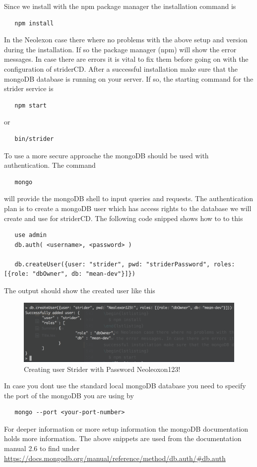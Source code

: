 Since we install with the npm package manager the installation command is
\begin{lstlisting}
   npm install
\end{lstlisting}
In the Neolexon case there where no problems with the above setup and version during the installation. If so the package manager (npm) will
show the error messages. In case there are errors it is vital to fix them before going on with the configuration of striderCD. After a
successful installation make sure that the mongoDB database is running on your server. If so, the starting command for the strider service is
\begin{lstlisting}
   npm start
\end{lstlisting}
or
\begin{lstlisting}
   bin/strider
\end{lstlisting}
To use a more secure approache the mongoDB should be used with authentication. The command
\begin{lstlisting}
   mongo
\end{lstlisting}
will provide the mongoDB shell to input queries and requests. The authentication plan is to create a mongoDB user which has access
rights to the database we will create and use for striderCD. The following code snipped shows how to to this
\begin{lstlisting}
   use admin
   db.auth( <username>, <password> )

   db.createUser({user: "strider", pwd: "striderPassword", roles: [{role: "dbOwner", db: "mean-dev"}]})
\end{lstlisting}
The output should show the created user like this
\begin{figure}[h!]
  \centering
      \includegraphics[width=1\textwidth]{images/createUser.png}
  \caption{Creating user Strider with Password Neoleoxon123!}
\end{figure}
In case you dont use the standard local mongoDB database you need to specify the port of the mongoDB you are using by
\begin{lstlisting}
   mongo --port <your-port-number>
\end{lstlisting}
For deeper information or more setup information the mongoDB documentation holds more information. The above snippets are
used from the documentation manual 2.6 to find under \url{https://docs.mongodb.org/manual/reference/method/db.auth/#db.auth}

